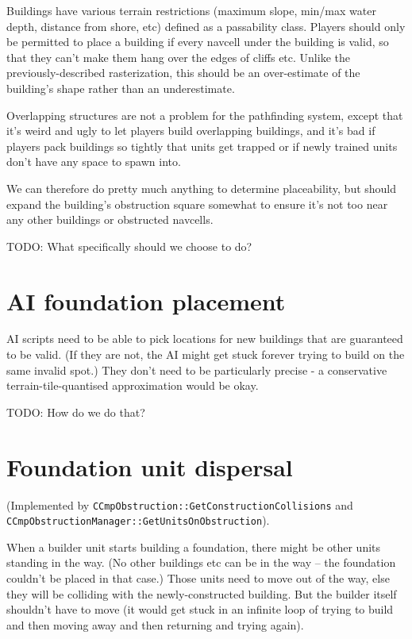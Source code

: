 \documentclass[a4paper,10pt]{article}
\begin{document}
Buildings have various terrain restrictions (maximum slope,
min/max water depth, distance from shore, etc)
defined as a passability class.
Players should only be permitted to place a building if every navcell
under the building is valid,
so that they can't make them hang over the edges of cliffs etc.
Unlike the previously-described rasterization,
this should be an over-estimate of the building's shape
rather than an underestimate.

Overlapping structures are not a problem for the pathfinding system,
except that it's weird and ugly to let players build overlapping buildings,
and it's bad if players pack buildings so tightly that units get trapped
or if newly trained units don't have any space to spawn into.

We can therefore do pretty much anything to determine placeability,
but should expand the building's obstruction square somewhat to ensure
it's not too near any other buildings or obstructed navcells.

TODO: What specifically should we choose to do?

\section{AI foundation placement}

AI scripts need to be able to pick locations for new buildings that are guaranteed
to be valid. (If they are not, the AI might get stuck forever trying to build on the
same invalid spot.)
They don't need to be particularly precise - a conservative terrain-tile-quantised approximation
would be okay.

TODO: How do we do that?

\section{Foundation unit dispersal}

(Implemented by \texttt{CCmpObstruction::GetConstructionCollisions}
and \texttt{CCmpObstructionManager::GetUnitsOnObstruction}).

When a builder unit starts building a foundation,
there might be other units standing in the way.
(No other buildings etc can be in the way -- the foundation couldn't be placed in that case.)
Those units need to move out of the way,
else they will be colliding with the newly-constructed building.
But the builder itself shouldn't have to move
(it would get stuck in an infinite loop of trying to build and then moving away and then returning and trying again).
\end{document}
